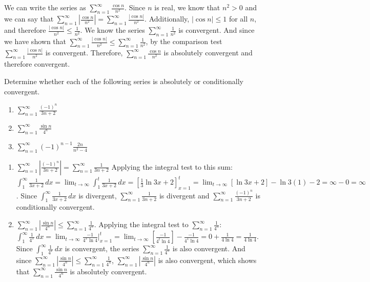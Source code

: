 \begin{Answer}[ref = absconv1]
We can write the series as $\sum_{n=1}^\infty \frac{\cos{n}}{n^2}$. Since 
$n$ is real, we know that $n^2 > 0$ and we can say that $\sum_{n=1}^\infty 
\left| \frac{\cos{n}}{n^2} \right| = \sum_{n=1}^\infty \frac{|\cos{n}|}
{n^2}$. Additionally, $|\cos{n}| \leq 1$ for all $n$, and therefore 
$\frac{|\cos{n}|}{n^2} \leq \frac{1}{n^2}$. We know the series $\sum_{n=1}^
\infty \frac{1}{n^2}$ is convergent. And since we have shown that $\sum_{n=1}
^\infty \frac{|\cos{n}|}{n^2} \leq \sum_{n=1}^\infty \frac{1}{n^2}$, by the 
comparison test $\sum_{n=1}^\infty \frac{|\cos{n}|}{n^2}$ is convergent. 
Therefore, $\sum_{n=1}^\infty \frac{\cos{n}}{n^2}$ is absolutely convergent 
and therefore convergent. 
\end{Answer}

\begin{Exercise}[label = absconv2]
Determine whether each of the following series is absolutely or conditionally 
convergent. 
\begin{enumerate}
\item $\sum_{n=1}^\infty \frac{(-1)^n}{3n + 2}$
\item $\sum_{n=1}^\infty \frac{\sin{n}}{4^n}$
\item $\sum_{n=1}^\infty (-1)^{n-1} \frac{2n}{n^2-4}$ 
\end{enumerate}
\vspace{50mm}
\end{Exercise}

\begin{Answer}[ref = absconv2]
\begin{enumerate}
\item $\sum_{n=1}^\infty \left| \frac{(-1)^n}{3n+2} \right| = \sum_{n=1}^
\infty \frac{1}{3n + 2}$ Applying the integral test to this sum: $\int_1^
\infty \frac{1}{3x+2}\,dx = \lim_{t \to \infty} \int_1^t \frac{1}{3x+2}\,dx = 
\left[ \frac{1}{3} \ln{3x + 2} \right]_{x=1}^t = \lim_{t \to \infty} \left[ 
\ln{3x + 2} \right] - \ln{3(1) - 2} = \infty - 0 = \infty$. Since $\int_1^\infty 
\frac{1}{3x + 2}\,dx$ is divergent, $\sum_{n=1}^\infty \frac{1}{3n + 2}$ is 
divergent and $\sum_{n=1}^\infty \frac{(-1)^n}{3n + 2}$ is conditionally 
convergent.
\item $\sum_{n=1}^\infty \left| \frac{\sin{n}}{4^n} \right| \leq \sum_{n=1}
^\infty \frac{1}{4^n}$. Applying the integral test to $\sum_{n=1}^\infty 
\frac{1}{4^n}$: $\int_1^\infty \frac{1}{4^x}\,dx = \lim_{t \to \infty} 
\frac{-1}{4^x \ln{4}}|_{x=1}^t = \lim_{t \to \infty} \left[ \frac{-1}{4^t 
\ln{4}} \right] - \frac{-1}{4^1 \ln{4}} = 0 + \frac{1}{4 \ln{4}} = \frac{1}{4 
\ln{4}}$. Since $\int_1^\infty \frac{1}{4^x}\,dx$ is convergent, the series 
$\sum_{n=1}^\infty \frac{1}{4^n}$ is also convergent. And since $\sum_{n=1}
^\infty \left| \frac{\sin{n}}{4^n} \right| \leq \sum_{n=1}^\infty 
\frac{1}{4^n}$, $\sum_{n=1}^\infty \left| \frac{\sin{n}}{4^n} \right|$ is 
also convergent, which shows that $\sum_{n=1}^\infty \frac{\sin{n}}{4^n}$ is 
absolutely convergent. 
\end{enumerate}
\end{Answer}

